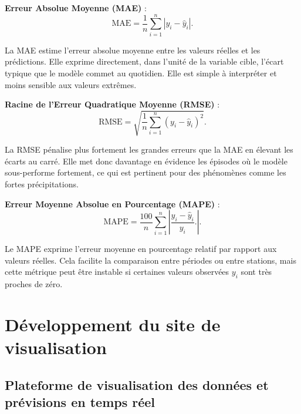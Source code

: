 \documentclass[a4paper,12pt,openany]{report}
\begin{document}
	\vspace{1em}
	
	\noindent \textbf{Erreur Absolue Moyenne (MAE)} :
	\begin{equation}
		\text{MAE} = \frac{1}{n} \sum_{i=1}^{n} \left| y_i - \hat{y}_i \right|          .
	\end{equation}
	
	La MAE estime l'erreur absolue moyenne entre les valeurs réelles et les prédictions. Elle exprime directement, dans l’unité de la variable cible, l’écart typique que le modèle commet au quotidien. Elle est simple à interpréter et moins sensible aux valeurs extrêmes.
	
	\vspace{1em}
	
	\noindent \textbf{Racine de l’Erreur Quadratique Moyenne (RMSE)} :
	\begin{equation}
		\text{RMSE} = \sqrt{ \frac{1}{n} \sum_{i=1}^{n} (y_i - \hat{y}_i)^2 }      .
	\end{equation}
	
	La RMSE pénalise plus fortement les grandes erreurs que la MAE en élevant les écarts au carré. Elle met donc davantage en évidence les épisodes où le modèle sous-performe fortement, ce qui est pertinent pour des phénomènes comme les fortes précipitations.
	
	\vspace{1em}
	
	\noindent \textbf{Erreur Moyenne Absolue en Pourcentage (MAPE)} :
	\begin{equation}
		\text{MAPE} = \frac{100}{n} \sum_{i=1}^{n} \left| \frac{y_i - \hat{y}_i}{y_i}  . \right|                  .
	\end{equation}
	
	Le MAPE exprime l’erreur moyenne en pourcentage relatif par rapport aux valeurs réelles. Cela facilite la comparaison entre périodes ou entre stations, mais cette métrique peut être instable si certaines valeurs observées $y_i$ sont très proches de zéro.
	

	\section{Développement du site de visualisation}

	\subsection{Plateforme de visualisation des données et prévisions en temps réel}
	
\end{document}
